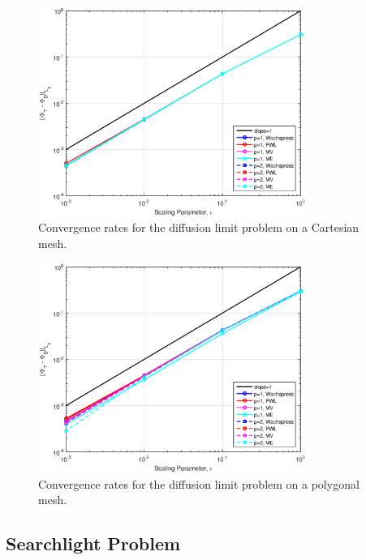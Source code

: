 \begin{figure}
\centering
\includegraphics[width=0.775\textwidth]{figures/sec_BF/DLConvergenceError_Cartesian.eps}
\caption{Convergence rates for the diffusion limit problem on a Cartesian mesh.}
\label{fig::BF_Results_DL_Conv_Cart}
\end{figure}

\begin{figure}
\centering
\includegraphics[width=0.775\textwidth]{figures/sec_BF/DLConvergenceError_SqPoly.eps}
\caption{Convergence rates for the diffusion limit problem on a polygonal mesh.}
\label{fig::BF_Results_DL_Conv_Poly}
\end{figure}

\subsection{Searchlight Problem}
\label{sec::BF_Results_SL}

